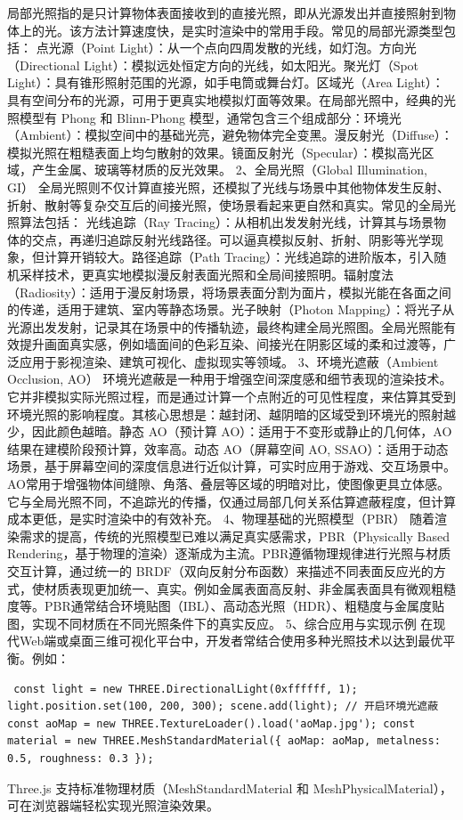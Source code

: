 局部光照指的是只计算物体表面接收到的直接光照，即从光源发出并直接照射到物体上的光。该方法计算速度快，是实时渲染中的常用手段。常见的局部光源类型包括： 点光源（Point Light）：从一个点向四周发散的光线，如灯泡。方向光（Directional Light）：模拟远处恒定方向的光线，如太阳光。聚光灯（Spot Light）：具有锥形照射范围的光源，如手电筒或舞台灯。区域光（Area Light）：具有空间分布的光源，可用于更真实地模拟灯面等效果。在局部光照中，经典的光照模型有 Phong 和 Blinn-Phong 模型，通常包含三个组成部分：环境光（Ambient）：模拟空间中的基础光亮，避免物体完全变黑。漫反射光（Diffuse）：模拟光照在粗糙表面上均匀散射的效果。镜面反射光（Specular）：模拟高光区域，产生金属、玻璃等材质的反光效果。 2、全局光照（Global Illumination, GI） 全局光照则不仅计算直接光照，还模拟了光线与场景中其他物体发生反射、折射、散射等复杂交互后的间接光照，使场景看起来更自然和真实。常见的全局光照算法包括： 光线追踪（Ray Tracing）：从相机出发发射光线，计算其与场景物体的交点，再递归追踪反射光线路径。可以逼真模拟反射、折射、阴影等光学现象，但计算开销较大。路径追踪（Path Tracing）：光线追踪的进阶版本，引入随机采样技术，更真实地模拟漫反射表面光照和全局间接照明。辐射度法（Radiosity）：适用于漫反射场景，将场景表面分割为面片，模拟光能在各面之间的传递，适用于建筑、室内等静态场景。光子映射（Photon Mapping）：将光子从光源出发发射，记录其在场景中的传播轨迹，最终构建全局光照图。全局光照能有效提升画面真实感，例如墙面间的色彩互染、间接光在阴影区域的柔和过渡等，广泛应用于影视渲染、建筑可视化、虚拟现实等领域。 3、环境光遮蔽（Ambient Occlusion, AO） 环境光遮蔽是一种用于增强空间深度感和细节表现的渲染技术。它并非模拟实际光照过程，而是通过计算一个点附近的可见性程度，来估算其受到环境光照的影响程度。其核心思想是：越封闭、越阴暗的区域受到环境光的照射越少，因此颜色越暗。静态 AO（预计算 AO）：适用于不变形或静止的几何体，AO结果在建模阶段预计算，效率高。动态 AO（屏幕空间 AO, SSAO）：适用于动态场景，基于屏幕空间的深度信息进行近似计算，可实时应用于游戏、交互场景中。AO常用于增强物体间缝隙、角落、叠层等区域的明暗对比，使图像更具立体感。它与全局光照不同，不追踪光的传播，仅通过局部几何关系估算遮蔽程度，但计算成本更低，是实时渲染中的有效补充。 4、物理基础的光照模型（PBR） 随着渲染需求的提高，传统的光照模型已难以满足真实感需求，PBR（Physically Based Rendering，基于物理的渲染）逐渐成为主流。PBR遵循物理规律进行光照与材质交互计算，通过统一的 BRDF（双向反射分布函数）来描述不同表面反应光的方式，使材质表现更加统一、真实。例如金属表面高反射、非金属表面具有微观粗糙度等。PBR通常结合环境贴图（IBL）、高动态光照（HDR）、粗糙度与金属度贴图，实现不同材质在不同光照条件下的真实反应。 5、综合应用与实现示例 在现代Web端或桌面三维可视化平台中，开发者常结合使用多种光照技术以达到最优平衡。例如： \begin{verbatim} const light = new THREE.DirectionalLight(0xffffff, 1); light.position.set(100, 200, 300); scene.add(light); // 开启环境光遮蔽 const aoMap = new THREE.TextureLoader().load('aoMap.jpg'); const material = new THREE.MeshStandardMaterial({ aoMap: aoMap, metalness: 0.5, roughness: 0.3 }); \end{verbatim} Three.js 支持标准物理材质（MeshStandardMaterial 和 MeshPhysicalMaterial），可在浏览器端轻松实现光照渲染效果。 